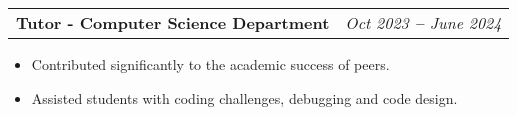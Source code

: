 \documentclass[letterpaper,11pt]{article}
\makeatletter
\newcommand{\resumeItem}[1]{
  \item\small{
    {#1 \vspace{-2pt}}
  }
}
\newcommand{\resumeSubSubheading}[2]{
    \vspace{-2pt}\item
    \begin{tabular*}{0.97\textwidth}[t]{l@{\extracolsep{\fill}}r}
      \textbf{#1} & \textit{\small #2} \\
    \end{tabular*}\vspace{-7pt}
}
\newcommand{\resumeOrganizationHeading}[4]{
  \vspace{-2pt}\item
    \begin{tabular*}{0.97\textwidth}[t]{l@{\extracolsep{\fill}}r}
      \textbf{#1} & \textit{\small #2} \\
      \textit{\small#3}
    \end{tabular*}\vspace{-7pt}
}
\newcommand{\resumeSubHeadingListStart}{\begin{itemize}[leftmargin=0.15in, label={}]}
\newcommand{\resumeSubHeadingListEnd}{\end{itemize}}
\newcommand{\resumeItemListStart}{\begin{itemize}}
\newcommand{\resumeItemListEnd}{\end{itemize}\vspace{-5pt}}
\makeatother
\begin{document}
    \resumeSubSubheading
      {Tutor - Computer Science Department}{Oct 2023 \textbf{--} June 2024}
      {}{}
        \resumeItemListStart
            \resumeItem{Contributed significantly to the academic success of peers.}
            \resumeItem{Assisted students with coding challenges, debugging and code design.}
        \resumeItemListEnd





        




    
    




    
\end{document}
